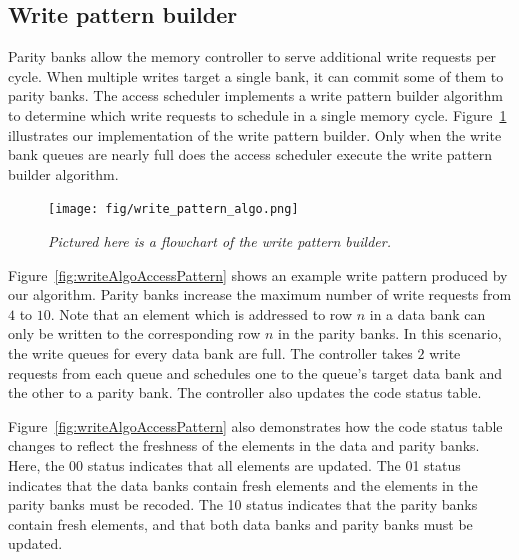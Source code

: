 \subsection{Write pattern builder}
\label{sec:writeCodingAlgo}
Parity banks allow the memory controller to serve additional write requests per cycle. When multiple writes target a single bank, it can commit some of them to parity banks. The access scheduler implements a write pattern builder algorithm to determine which write requests to schedule in a single memory cycle. Figure~\ref{fig:writeFlow} illustrates our implementation of the write pattern builder. Only when the write bank queues are nearly full does the access scheduler execute the write pattern builder algorithm. 


\begin{figure}[htbp]
\centering
	\texttt{[image: fig/write\_pattern\_algo.png]}
	\caption{\it{Pictured here is a flowchart of the write pattern builder.}}
	\label{fig:writeFlow}
\end{figure}


Figure~\ref{fig:writeAlgoAccessPattern} shows an example write pattern produced by our algorithm. Parity banks increase the maximum number of write requests from $4$ to $10$. Note that an element which is addressed to row $n$ in a data bank can only be written to the corresponding row $n$ in the parity banks. In this scenario, the write queues for every data bank are full. The controller takes $2$ write requests from each queue and schedules one to the queue's target data bank and the other to a parity bank. The controller also updates the code status table.

Figure~\ref{fig:writeAlgoAccessPattern} also demonstrates how the code status table changes to reflect the freshness of the elements in the data and parity banks. Here, the 00 status indicates that all elements are updated. The 01 status indicates that the data banks contain fresh elements and the elements in the parity banks must be recoded. The 10 status indicates that the parity banks contain fresh elements, and that both data banks and parity banks must be updated.


